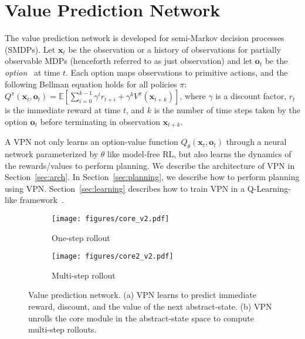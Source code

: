 \documentclass{article}
\newcommand{\option}{o}
\newcommand{\cutsectiondown}{\vspace*{-0.03in}}
\begin{document}
\section{Value Prediction Network}
\cutsectiondown
The value prediction network is developed for semi-Markov decision processes (SMDPs). Let $\textbf{x}_t$ be the observation or a history of observations for partially observable MDPs (henceforth referred to as just observation) and let $\textbf{\option{}}_t$ be the  \textit{option}~\citep{sutton1999between,Stolle2002LearningOI,precup2000temporal} at time $t$. Each option maps 
observations to primitive actions, and the following Bellman equation holds for all policies $\pi$: $Q^{\pi}(\textbf{x}_t,\textbf{\option{}}_t) = \mathbb{E}[ \sum_{i=0}^{k-1}\gamma^{i}r_{t+i} + \gamma^{k}V^{\pi}(\textbf{x}_{t+k})]$, 
where $\gamma$ is a discount factor, $r_t$ is the immediate reward at time $t$, and $k$ is the number of time steps taken by the option $\textbf{\option{}}_t$ before terminating in observation $\textbf{x}_{t+k}$.


A VPN not only learns an option-value function $Q_{\theta}\left(\textbf{x}_t,\textbf{\option{}}_t\right)$ through a neural network parameterized by $\theta$ like model-free RL, but also learns the dynamics of the rewards/values to perform planning. We describe the architecture of VPN in Section~\ref{sec:arch}. In Section~\ref{sec:planning}, we describe how to perform planning using VPN. Section~\ref{sec:learning} describes how to train VPN in a Q-Learning-like framework~\cite{watkins1992q}.

\begin{figure}
    \centering
    \begin{subfigure}{0.43\linewidth}
    		\centering
\texttt{[image: figures/core\_v2.pdf]} 
	    \vspace{-5pt}
	    \caption{One-step rollout}
	    \label{fig:1-step}
   	\end{subfigure}
   	\hspace{0.3in}
   	\begin{subfigure}{0.43\linewidth}
    		\centering
	    \texttt{[image: figures/core2\_v2.pdf]}
\vspace{-5pt}
	    \caption{Multi-step rollout}
	    \label{fig:n-step}
   	\end{subfigure}
   	\vspace{-5pt}
	\caption{Value prediction network. (a) VPN learns to predict immediate reward, discount, and the value of the next abstract-state. (b) VPN unrolls the core module in the abstract-state space to compute multi-step rollouts. } 
	\vspace{-10pt}
	\label{fig:arch}
\end{figure}
\end{document}
